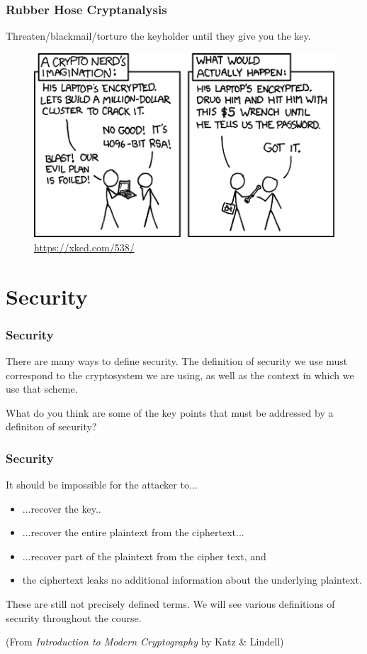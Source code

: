\documentclass{beamer}
\newcommand{\<}{\langle}
\renewcommand{\>}{\rangle}
\begin{document}
\begin{frame}
\frametitle{Rubber Hose Cryptanalysis}

Threaten/blackmail/torture the keyholder until they give you the key. 

\begin{figure}
\includegraphics[scale=.5]{IMG/comic3.png}
\caption{\url{https://xkcd.com/538/}}
\end{figure}
\end{frame}


\section{Security}

\begin{frame}
\frametitle{Security}

There are many ways to define security. The definition of security we use must correspond to the cryptosystem we are using, as well as the context in which we use that scheme.  \newline

What do you think are some of the key points that must be addressed by a definiton of security?
\end{frame}

\begin{frame}
\frametitle{Security}

It should be impossible for the attacker to...
\begin{itemize}
\item ...recover the key..
\item ...recover the entire plaintext from the ciphertext...
\item ...recover part of the plaintext from the cipher text, and 
\item the ciphertext leaks no additional information about the underlying plaintext.
\end{itemize}

These are still not precisely defined terms. We will see various definitions of security throughout the course. \newline

\tiny (From \emph{Introduction to Modern Cryptography}  by Katz \& Lindell)
\end{frame}
\end{document}
